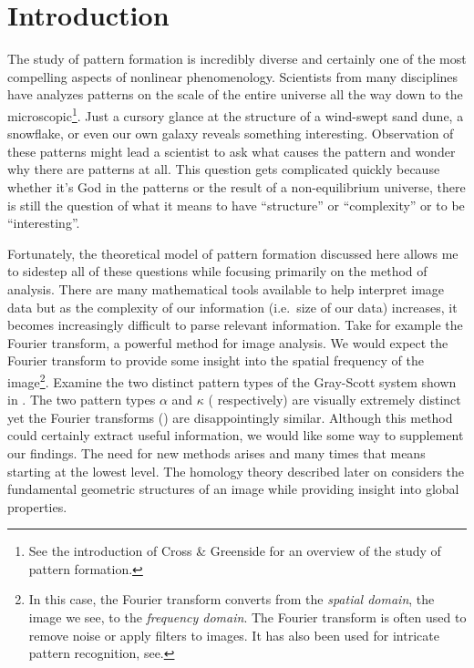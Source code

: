 		
\chapter*{Introduction}

	The study of pattern formation is incredibly diverse and certainly one of the most compelling aspects of nonlinear phenomenology. Scientists from many disciplines have analyzes patterns on the scale of the entire universe all the way down to the microscopic\footnote{See the introduction of Cross \& Greenside for an overview of the study of pattern formation.}. Just a cursory glance at the structure of a wind-swept sand dune, a snowflake, or even our own galaxy reveals something interesting. Observation of these patterns might lead a scientist to ask what causes the pattern and wonder why there are patterns at all. This question gets complicated quickly because whether it's God in the patterns or the result of a non-equilibrium universe, there is still the question of what it means to have ``structure'' or ``complexity'' or to be ``interesting''.
	
	Fortunately, the theoretical model of pattern formation discussed here allows me to sidestep all of these questions while focusing primarily on the method of analysis. There are many mathematical tools available to help interpret image data but as the complexity of our information (i.e.\ size of our data) increases, it becomes increasingly difficult to parse relevant information. Take for example the Fourier transform, a powerful method for image analysis. We would expect the Fourier transform to provide some insight into the spatial frequency of the image\footnote{In this case, the Fourier transform converts from the \textit{spatial domain}, the image we see, to the \textit{frequency domain}. The Fourier transform is often used to remove noise or apply filters to images. It has also been used for intricate pattern recognition, see.}. Examine the two distinct pattern types of the Gray-Scott system shown in . The two pattern types $\alpha$ and $\kappa$ ( respectively) are visually extremely distinct yet the Fourier transforms () are disappointingly similar. Although this method could certainly extract useful information, we would like some way to supplement our findings. The need for new methods arises and many times that means starting at the lowest level. The homology theory described later on considers the fundamental geometric structures of an image while providing insight into global properties.
	

